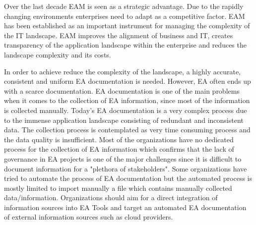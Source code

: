 Over the last decade EAM is seen as a strategic advantage. \cite{Roth2013}
Due to the rapidly changing environments enterprises need to adapt as a competitive factor. \cite{Ahlemann2012}
EAM has been established as an important instrument for managing the complexity of the IT landscape.
EAM improves the alignment of business and IT, creates transparency of the application landscape within the enterprise and reduces the landscape complexity and its costs. \cite{Ahlemann2012}\cite{Roth2013}

In order to achieve reduce the complexity of the landscape, a highly accurate, consistent and uniform EA documentation is needed. However, EA often ends up with a scarce documentation.\cite{Roth2013} EA documentation is one of the main problems when it comes to the collection of EA information, since most of the information is collected manually. Today's EA documentation is a very complex process due to the immense application landscape consisting of redundant and inconsistent data. \cite{Ahlemann2012}
The collection process is contemplated as very time consuming process and the data quality is insufficient. \cite{Hauder2012}\cite{Farwick2013}\cite{Roth2013}\cite{Holm2014}
Most of the organizations have no dedicated process for the collection of EA information which confirms that the lack of governance in EA projects is one of the major challenges since it is difficult to document information for a "plethora of stakeholders". \cite{Hauder2013} \cite{Lucke2010} Some organizations have tried to automate the process of EA documentation but the automated process is mostly limited to import manually a file which contains manually collected data/information. 
Organizations should aim for a direct integration of information sources into EA Tools and target an automated EA documentation of external information sources such as cloud providers. 

